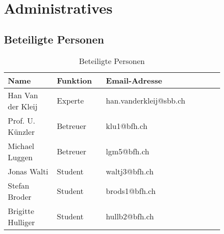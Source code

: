 \chapter{Administratives}

\section{Beteiligte Personen}

\begin{table}[ht]
\begin{tabular}{|p{0.2\linewidth}|p{0.2\linewidth}|p{0.48\linewidth}|}
\hline \bfseries Name & \bfseries Funktion & \bfseries Email-Adresse \\  \hline
\hline Han Van der Kleij & Experte & han.vanderkleij@sbb.ch \\ \hline
\hline Prof. U. K\"unzler & Betreuer & klu1@bfh.ch \\
\hline Michael Luggen & Betreuer & lgm5@bfh.ch \\ \hline
\hline Jonas Walti & Student & waltj3@bfh.ch \\
\hline Stefan Broder & Student & brods1@bfh.ch \\
\hline Brigitte Hulliger & Student & hullb2@bfh.ch \\
\hline 
\end{tabular} 
\caption{Beteiligte Personen}
\end{table}
